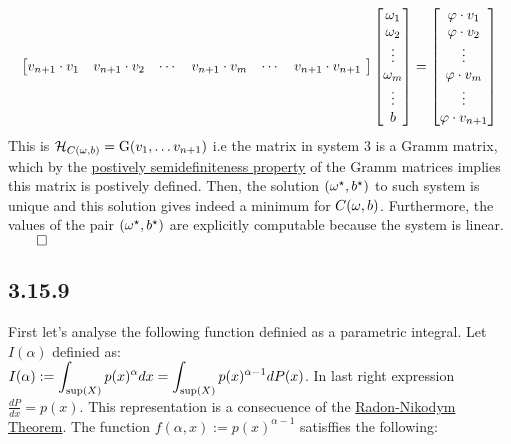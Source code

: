 \documentclass{exam}
\renewenvironment{proof}{{\noindent\itshape\ignorespaces}}{{\hfill$\qed$\\}}
\begin{document}
\begin{proof}
\begin{equation}
\begin{bmatrix}
       v_{n+1}\cdot v_1 & v_{n+1} \cdot v_2 & \cdots & v_{n+1} \cdot v_m & \cdots & v_{n+1} \cdot v_{n+1}\
    \end{bmatrix}
    \begin{bmatrix}
        \omega_1 \\
        \omega_2\\
        \vdots \\
        \omega_m\\
       \vdots \\
        b
    \end{bmatrix} 
    = \begin{bmatrix}
        \bold{\varphi} \cdot v_1\\
        \bold{\varphi} \cdot v_2\\
        \vdots \\
        \bold{\varphi} \cdot v_m\\
       \vdots \\
       \bold{\varphi} \cdot v_{n+1}
    \end{bmatrix} 
\end{equation}
This is  $\mathcal{H}_{C(\tiny \omega, b)} = \text{G}(v_1, \ldots v_{n+1})$ i.e the matrix in system $3$ is a Gramm matrix, which by the \href{https://en.wikipedia.org/wiki/Gram_matrix}{postively semidefiniteness property} of the Gramm matrices implies this matrix is postively defined. Then, the solution $(\bold{\omega}^{\star}, b^{\star})$ to such system is unique and this solution gives indeed a minimum for $C(\bold{\omega},b)$. Furthermore, the values of the pair $(\bold{\omega}^{\star}, b^{\star})$ are explicitly computable because 
the system is linear. 
\end{proof}
\subsection*{3.15.9}
First let's analyse the following function definied as a parametric integral. Let $I(\alpha)$ definied as:\\
$I(\alpha) := \displaystyle \int_{\tiny \text{sup}(X)} p(x)^{\alpha}d x = \displaystyle \int_{\tiny \text{sup}(X)} p(x)^{\alpha-1}d P(x)$. In last right expression $\frac{d P}{d x} = p(x)$. This representation is a consecuence of the \href{https://en.wikipedia.org/wiki/Radon%E2%80%93Nikodym_theorem}{Radon-Nikodym Theorem}. The function $f(\alpha, x) := p(x)^{\alpha - 1}$ satisffies the following:
\end{document}
